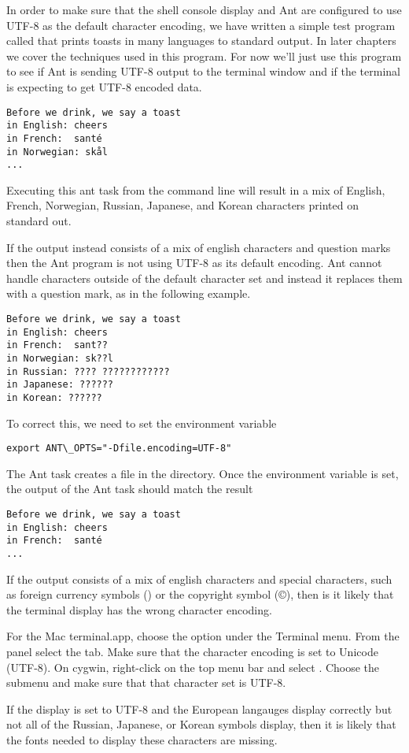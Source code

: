 In order to make sure that the shell console display and Ant are
configured to use UTF-8 as the default character encoding, we have written
a simple test program called  that prints toasts in many
languages to standard output.
In later chapters we cover the techniques used in this program.
For now we'll just use this program to see if
Ant is sending UTF-8 output to the terminal window and if the
terminal is expecting to get UTF-8 encoded data.
\begin{verbatim} 
Before we drink, we say a toast 
in English: cheers  
in French:  santé
in Norwegian: skål
...
\end{verbatim}
Executing this ant task from the command line will result in a mix of
English, French, Norwegian, Russian, Japanese, and Korean characters
printed on standard out.

If the output instead consists of a mix of english characters and question marks
then the Ant program is not using UTF-8 as its default encoding.  Ant cannot handle
characters outside of the default character set and instead it replaces them with
a question mark, as in the following example.
\begin{verbatim}
Before we drink, we say a toast 
in English: cheers  
in French:  sant??
in Norwegian: sk??l
in Russian: ???? ????????????
in Japanese: ??????
in Korean: ??????
\end{verbatim} 
To correct this, we need to set the  environment variable
\begin{verbatim} 
export ANT\_OPTS="-Dfile.encoding=UTF-8"
\end{verbatim}
The Ant  task creates a file  in the 
 directory.
Once the  environment variable is set, the output of the Ant
 task should match the result
\begin{verbatim}
Before we drink, we say a toast
in English: cheers
in French:  santé
...
\end{verbatim}

If the output consists of a mix of english characters and special characters,
such as foreign currency symbols ({\textyen})  or the copyright symbol ({\copyright}),
then is it likely that the terminal display has the wrong character encoding.

For the Mac terminal.app, choose the  option under
the Terminal menu.  From the  panel select the  tab.
Make sure that the character encoding is set to Unicode (UTF-8).
On cygwin, right-click on the top menu bar and select .
Choose the  submenu and make sure that that character set is UTF-8.

If the display is set to UTF-8 and the European langauges display correctly but
not all of the Russian, Japanese, or Korean symbols display, then it is likely
that the fonts needed to display these characters are missing.

